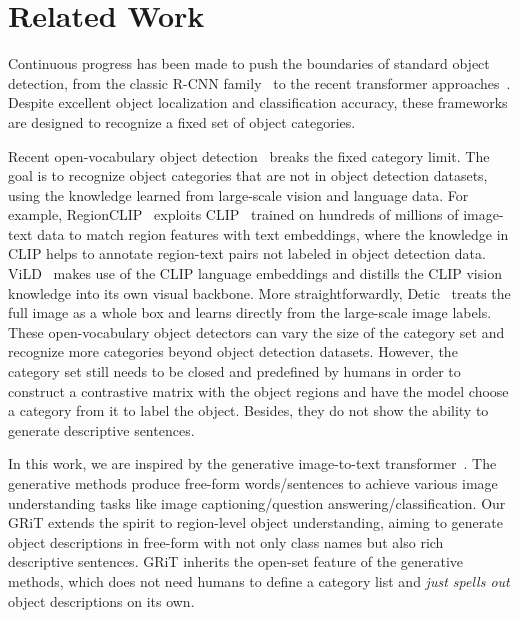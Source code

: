 \documentclass[10pt,twocolumn,letterpaper]{article}
\begin{document}
\section{Related Work}
Continuous progress has been made to push the boundaries of standard object detection, from the classic R-CNN family~\cite{ren2015faster,chen2019hybrid,cai2018cascade} to the recent transformer approaches~\cite{zhang2022dino,carion2020end,zhu2020deformable}. Despite excellent object localization and classification accuracy, these frameworks are designed to recognize a fixed set of object categories.

Recent open-vocabulary object detection~\cite{zhong2022regionclip,zhou2022detecting,zareian2021open,gu2021open,gaoopen,li2022grounded} breaks the fixed category limit. The goal is to recognize object categories that are not in object detection datasets, using the knowledge learned from large-scale vision and language data. For example, RegionCLIP~\cite{zhong2022regionclip} exploits CLIP~\cite{radford2021learning} trained on hundreds of millions of image-text data to match region features with text embeddings, where the knowledge in CLIP helps to annotate region-text pairs not labeled in object detection data. ViLD~\cite{gu2021open} makes use of the CLIP language embeddings and distills the CLIP vision knowledge into its own visual backbone. More straightforwardly, Detic~\cite{zhou2022detecting} treats the full image as a whole box and learns directly from the large-scale image labels. These open-vocabulary object detectors can vary the size of the category set and recognize more categories beyond object detection datasets. However, the category set still needs to be closed and predefined by humans in order to construct a contrastive matrix with the object regions and have the model choose a category from it to label the object. Besides, they do not show the ability to generate descriptive sentences. 

In this work, we are inspired by the generative image-to-text transformer~\cite{wang2022git,hu2022scaling,yu2022coca}. The generative methods produce free-form words/sentences to achieve various image understanding tasks like image captioning/question answering/classification. Our GRiT extends the spirit to region-level object understanding, aiming to generate object descriptions in free-form with not only class names but also rich descriptive sentences. GRiT inherits the open-set feature of the generative methods, which does not need humans to define a category list and \emph{just spells out} object descriptions on its own.
\end{document}

